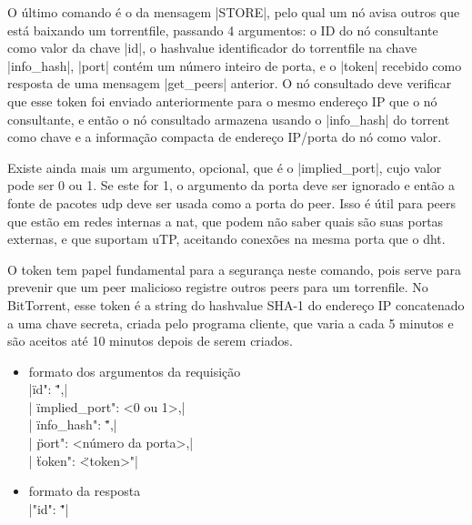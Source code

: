 

O último comando é o da mensagem \bverb|STORE|, pelo qual um nó avisa outros que está
baixando um \gls*{torrentfile}, passando 4 argumentos: o ID do nó consultante como
valor da chave \bverb|id|, o \gls*{hashvalue} identificador do \gls*{torrentfile} na
chave \bverb|info_hash|, \bverb|port| contém um número inteiro de porta, e o
\bverb|token| recebido como resposta de uma mensagem \bverb|get_peers| anterior. O nó
consultado deve verificar que esse token foi enviado anteriormente para o mesmo endereço
IP que o nó consultante, e então o nó consultado armazena usando o \bverb|info_hash| do
torrent como chave e a informação compacta de endereço IP/porta do nó como valor.

Existe ainda mais um argumento, opcional, que é o \bverb|implied_port|, cujo valor pode
ser 0 ou 1. Se este for 1, o argumento da porta deve ser ignorado e então a fonte de
pacotes \gls*{udp} deve ser usada como a porta do \gls*{peer}. Isso é útil para
\glspl*{peer} que estão em redes internas a \gls{nat}, que podem não saber quais são
suas portas externas, e que suportam uTP, aceitando conexões na mesma porta que o
\gls*{dht}.

O token tem papel fundamental para a segurança neste comando, pois serve para prevenir
que um \gls*{peer} malicioso registre outros \glspl*{peer} para um \gls*{torrenfile}.
No BitTorrent, esse token é a \gls*{string} do \gls*{hashvalue} SHA-1 do endereço IP
concatenado a uma chave secreta, criada pelo programa cliente, que varia a cada 5
minutos e são aceitos até 10 minutos depois de serem criados.

\newpage
\begin{itemize}
    \item formato dos argumentos da requisição \\
        \sverb|{\"id": \"<IDs dos nós consultantes>",| \\
        \sverb| \"implied_port": <0 ou 1>,| \\
        \sverb| \"info_hash": \"<hash de 20 bytes do torrent>",| \\
        \sverb| \"port": <número da porta>,| \\
        \sverb| \"token": \"<token>"}|

    \item formato da resposta \\
        \sverb|{"id": \"<IDs dos nós consultados>"}|
\end{itemize}

